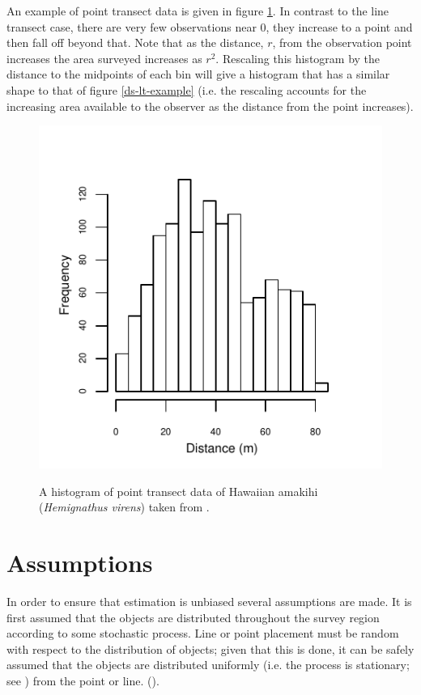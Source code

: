 An example of point transect data is given in figure \ref{ds-pt-example}. In contrast to the line transect case, there are very few observations near 0, they increase to a point and then fall off beyond that. Note that as the distance, $r$, from the observation point increases the area surveyed increases as $r^2$. Rescaling this histogram by the distance to the midpoints of each bin will give a histogram that has a similar shape to that of figure \ref{ds-lt-example} (i.e. the rescaling accounts for the increasing area available to the observer as the distance from the point increases).

\begin{figure}
\centering
\includegraphics{intro/figs/pt-data-example.pdf}\\
\caption{A histogram of point transect data of Hawaiian amakihi (\textit{Hemignathus virens}) taken from .}
\label{ds-pt-example}
\end{figure}


\section{Assumptions}
\label{ds-assumptions}
\label{cor-7s2}In order to ensure that estimation is unbiased several assumptions are made. It is first assumed that the objects are distributed throughout the survey region according to some stochastic process. Line or point placement must be random with respect to the distribution of objects; given that this is done, it can be safely assumed that the objects are distributed uniformly (i.e. the process is stationary; see ) from the point or line. (\cite[p.  29]{IDS})\label{cor-7s12}. 

